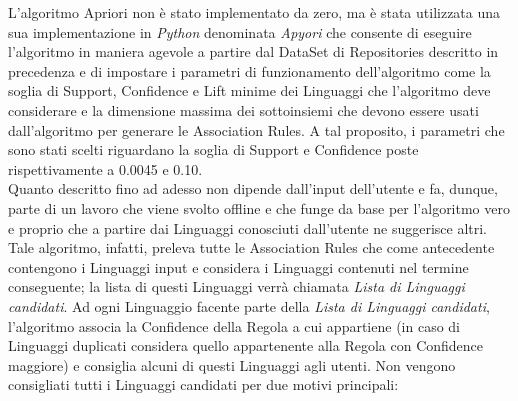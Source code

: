 L'algoritmo Apriori non è stato implementato da zero, ma è stata utilizzata una sua implementazione in \emph{Python} denominata \emph{Apyori} \cite{Apyori} che consente di eseguire l'algoritmo in maniera agevole a partire dal DataSet di Repositories descritto in precedenza e di impostare i parametri di funzionamento dell'algoritmo come la soglia di Support, Confidence e Lift minime dei Linguaggi che l'algoritmo deve considerare e la dimensione massima dei sottoinsiemi che devono essere usati dall'algoritmo per generare le Association Rules. A tal proposito, i parametri che sono stati scelti riguardano la soglia di Support e Confidence poste rispettivamente a 0.0045 e 0.10.\\
Quanto descritto fino ad adesso non dipende dall'input dell'utente e fa, dunque, parte di un lavoro che viene svolto offline e che funge da base per l'algoritmo vero e proprio che a partire dai Linguaggi conosciuti dall'utente ne suggerisce altri. Tale algoritmo, infatti, preleva tutte le Association Rules che come antecedente contengono i Linguaggi input e considera i Linguaggi contenuti nel termine conseguente; la lista di questi Linguaggi verrà chiamata \emph{Lista di Linguaggi candidati}. Ad ogni Linguaggio facente parte della \emph{Lista di Linguaggi candidati}, l'algoritmo associa la Confidence della Regola a cui appartiene (in caso di Linguaggi duplicati considera quello appartenente alla Regola con Confidence maggiore) e consiglia alcuni di questi Linguaggi agli utenti. Non vengono consigliati tutti i Linguaggi candidati per due motivi principali: 
